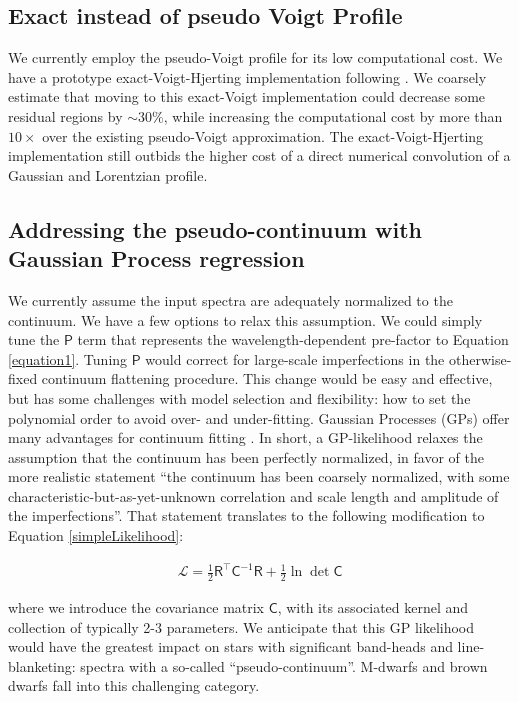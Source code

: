 \documentclass[twocolumn]{aastex631}
\begin{document}
\subsection{Exact instead of pseudo Voigt Profile}
We currently employ the pseudo-Voigt profile for its low computational cost. We have a prototype exact-Voigt-Hjerting implementation following \citet{2022ApJS..258...31K}. We coarsely estimate that moving to this exact-Voigt implementation could decrease some residual regions by $\sim 30\%$, while increasing the computational cost by more than $10\times$ over the existing pseudo-Voigt approximation. The exact-Voigt-Hjerting implementation still outbids the higher cost of a direct numerical convolution of a Gaussian and Lorentzian profile.



\subsection{Addressing the pseudo-continuum with Gaussian Process regression}

We currently assume the input spectra are adequately normalized to the continuum. We have a few options to relax this assumption. We could simply tune the $\mathsf{P}$ term that represents the wavelength-dependent pre-factor to Equation \ref{equation1}. Tuning $\mathsf{P}$ would correct for large-scale imperfections in the otherwise-fixed continuum flattening procedure. This change would be easy and effective, but has some challenges with model selection and flexibility: how to set the polynomial order to avoid over- and under-fitting. Gaussian Processes (GPs) offer many advantages for continuum fitting \citep{czekala15}. In short, a GP-likelihood relaxes the assumption that the continuum has been perfectly normalized, in favor of the more realistic statement ``the continuum has been coarsely normalized, with some characteristic-but-as-yet-unknown correlation and scale length and amplitude of the imperfections''. That statement translates to the following modification to Equation \ref{simpleLikelihood}:

\begin{eqnarray}
    \mathcal{L} = \frac{1}{2}\mathsf{R^\intercal} \mathsf{C}^{-1} \mathsf{R} +\frac{1}{2}\ln{\det{\mathsf{C}}} \label{GPLikelihood}
\end{eqnarray}

\noindent where we introduce the covariance matrix $\mathsf{C}$, with its associated kernel and collection of typically 2-3 parameters. We anticipate that this GP likelihood would have the greatest impact on stars with significant band-heads and line-blanketing: spectra with a so-called ``pseudo-continuum''. M-dwarfs and brown dwarfs fall into this challenging category.
\end{document}
